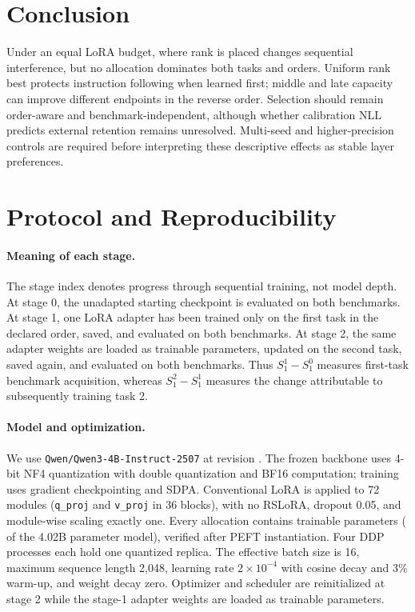 \documentclass{article}
\begin{document}
\section{Conclusion}
Under an equal LoRA budget, where rank is placed changes sequential
interference, but no allocation dominates both tasks and orders. Uniform rank
best protects instruction following when learned first; middle and late
capacity can improve different endpoints in the reverse order. Selection
should remain order-aware and benchmark-independent, although whether
calibration NLL predicts external retention remains unresolved. Multi-seed and
higher-precision controls are required before interpreting these descriptive
effects as stable layer preferences.

\clearpage



\clearpage
\appendix

\section{Protocol and Reproducibility}
\label{app:protocol}

\paragraph{Meaning of each stage.}
The stage index denotes progress through sequential training, not model depth.
At stage 0, the unadapted starting checkpoint is evaluated on both benchmarks.
At stage 1, one LoRA adapter has been trained only on the first task in the
declared order, saved, and evaluated on both benchmarks. At stage 2, the same
adapter weights are loaded as trainable parameters, updated on the second
task, saved again, and evaluated on both benchmarks. Thus $S_1^1-S_1^0$
measures first-task benchmark acquisition, whereas $S_1^2-S_1^1$ measures the
change attributable to subsequently training task 2.

\paragraph{Model and optimization.}
We use \texttt{Qwen/Qwen3-4B-Instruct-2507} at revision
. The frozen backbone uses
4-bit NF4 quantization with double quantization and BF16 computation; training
uses gradient checkpointing and SDPA. Conventional LoRA is applied to 72
modules (\texttt{q\_proj} and \texttt{v\_proj} in 36 blocks), with no RSLoRA,
dropout 0.05, and module-wise scaling exactly one. Every allocation contains
\NumLoraParameters{} trainable parameters (\TrainablePercent{} of the 4.02B
parameter model), verified after PEFT instantiation. Four DDP processes each
hold one quantized replica. The effective batch size is 16, maximum sequence
length 2,048, learning rate $2\times10^{-4}$ with cosine decay and 3\%
warm-up, and weight decay zero. Optimizer and scheduler are reinitialized at
stage 2 while the stage-1 adapter weights are loaded as trainable parameters.
\end{document}
